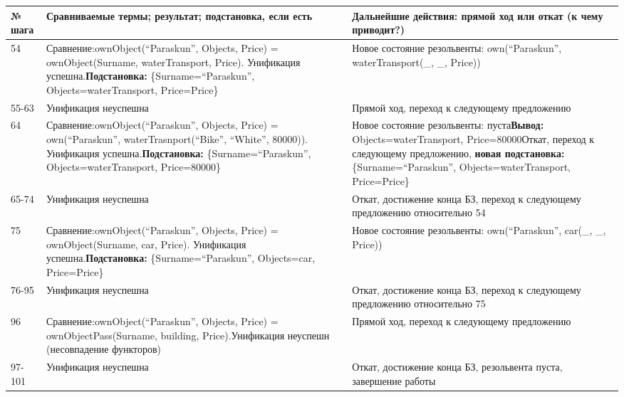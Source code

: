 \documentclass[14pt,a4paper]{scrreprt}
\begin{document}
\begin{table}[H]
	\begin{tabular}{|p{1.2cm\small}|p{9cm\small}|p{5cm\small}|}	
		\hline
		№ шага & Сравниваемые термы; результат; подстановка, если есть & Дальнейшие действия: прямой ход или откат (к чему приводит?)\\
		\hline
		54 & Сравнение:\linebreak ownObject(``Paraskun'', Objects, Price) = ownObject(Surname, waterTransport, Price). Унификация успешна.\linebreak \textbf{Подстановка:} \{Surname=``Paraskun'', Objects=waterTransport, Price=Price\} & Новое состояние резольвенты: own(``Paraskun'', waterTransport(\_, \_, Price))\\
		\hline
		55-63 & Унификация неуспешна & Прямой ход, переход к следующему предложению\\
		\hline
		64 & Сравнение:\linebreak ownObject(``Paraskun'', Objects, Price) = own(``Paraskun'', waterTrasnport(``Bike'', ``White'', 80000)). Унификация успешна.\linebreak \textbf{Подстановка:} \{Surname=``Paraskun'', Objects=waterTransport, Price=80000\} & Новое состояние резольвенты: пуста\linebreak \textbf{Вывод:} Objects=waterTransport, Price=80000\linebreak Откат, переход к следующему предложению, \textbf{новая подстановка:} \{Surname=``Paraskun'', Objects=waterTransport, Price=Price\}\\
		\hline
		65-74 & Унификация неуспешна & Откат, достижение конца БЗ, переход к следующему предложению относительно 54\\
		\hline
		75 & Сравнение:\linebreak ownObject(``Paraskun'', Objects, Price) = ownObject(Surname, car, Price). Унификация успешна.\linebreak \textbf{Подстановка:} \{Surname=``Paraskun'', Objects=car, Price=Price\} & Новое состояние резольвенты: own(``Paraskun'', car(\_, \_, Price))\\
		\hline
		76-95 & Унификация неуспешна & Откат, достижение конца БЗ, переход к следующему предложению относительно 75\\
		\hline
		96 & Сравнение:\linebreak ownObject(``Paraskun'', Objects, Price) = ownObjectPass(Surname, building, Price).Унификация неуспешн (несовпадение функторов) & Прямой ход, переход к следующему предложению\\
		\hline
		97-101 & Унификация неуспешна & Откат, достижение конца БЗ, резольвента пуста, завершение работы\\
		\hline
	\end{tabular}
\end{table}
\end{document}
